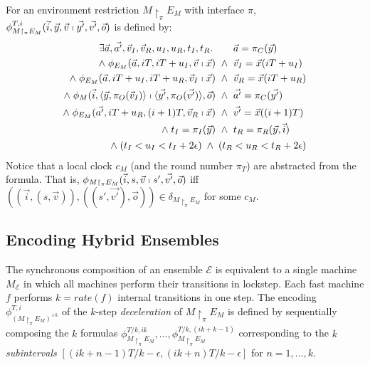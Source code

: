 \begin{definition}
For an environment restriction $M \restriction_\pi E_M$
with  interface %
$\pi$, %
$\phi_{M \restriction_\pi E_M}^{T,i}(\vec{i}, \vec{y}, \vec{v} \shortmid \vec{y'}, \vec{v'}, \vec{o})$
is defined %
by:
\begin{align*}
\begin{alignedat}{3}
\exists \vec{a},\vec{a'}, \vec{v}_I, \vec{v}_R, u_I, u_R, t_I, t_R.\;
&&&
\vec{a} = \pi_C(\vec{y})
\\
\wedge\;
\phi_{E_M}(\vec{a},iT,iT+u_I,\vec{v} \shortmid \vec{x})
&\;\;\wedge\;\;&&
\vec{v}_I = \vec{x}(iT+u_I)
\\
\wedge\;
\phi_{E_M}(\vec{a},iT+u_I,iT+u_R,\vec{v}_I \shortmid \vec{x})
&\;\;\wedge\;\;&&
\vec{v}_R = \vec{x}(iT+u_R)
\\
\wedge\;
\phi_M(\vec{i},\langle\vec{y},\pi_O(\vec{v}_I)\rangle \shortmid \langle\vec{y'},\pi_O(\vec{v'})\rangle, \vec{o})
&\;\;\wedge\;\;&&
\vec{a'} = \pi_C(\vec{y'})
\\
\wedge\;
\phi_{E_M}(\vec{a'},iT+u_R, (i+1)T ,\vec{v}_R \shortmid \vec{x})
&\;\;\wedge\;\;&&
\vec{v'} = \vec{x}((i+1)T)
\\
\wedge\;
t_I = \pi_I(\vec{y})
&\;\;\wedge\;\;&&
t_R = \pi_R(\vec{y},\vec{i})
\end{alignedat}
\\
\begin{alignedat}{3}
\wedge\;
(t_I < u_I < t_I + 2\epsilon)
\;\wedge\;
(t_R < u_R < t_R + 2\epsilon)
\end{alignedat}
\end{align*}
%
Notice that a local clock $c_M$ (and the round number $\pi_T$)
are abstracted from the formula.
That is,
$\phi_{M \restriction_\pi E_M}(\vec{i}, s, \vec{v} \shortmid s', \vec{v'}, \vec{o})$
iff
$( (\vec{i}, (s,\vec{v})), ((s',\vec{v'}), \vec{o}) ) \in \delta_{M \restriction_\pi E_M}$
for some $c_M$.
\end{definition}




\subsection{Encoding Hybrid Ensembles}

The synchronous composition  of an ensemble 
$\mathcal{E}$ is equivalent to a single machine $M_\mathcal{E}$
in which all machines perform their transitions in lockstep.
Each fast machine $f$  performs $k = \mathit{rate}(f)$  internal transitions in one step.
%
The encoding
$\phi_{(M \restriction_\pi E_M)^{\times k}}^{T, i}$
of the $k$-step \emph{deceleration} of %
$M \restriction_\pi E_M$
is defined by sequentially 
composing the 
$k$ formulas $\phi_{M \restriction_\pi E_M}^{T/k,ik},\ldots,\phi_{M \restriction_\pi E_M}^{T/k,(ik+k-1)}$
corresponding  to the $k$  \emph{subintervals} $[(ik+n-1)T/k-\epsilon,(ik+n)T/k-\epsilon]$ 
for $n=1,\ldots,k$.

